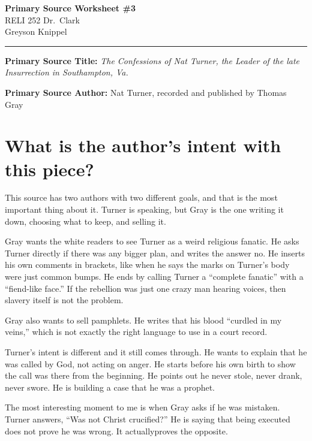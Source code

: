 \documentclass[12pt]{article}
\begin{document}
\begin{center}
	{\Large\bfseries Primary Source Worksheet \#3}\\[0.6em]
	RELI 252 \quad\textbullet\quad Dr.\ Clark\\[0.3em]
	Greyson Knippel
\end{center}

\vspace{1em}
\hrule
\vspace{1.5em}

\noindent\textbf{Primary Source Title:} \textit{The Confessions of Nat Turner, the Leader of the late Insurrection in Southampton, Va.}

\vspace{0.5em}

\noindent\textbf{Primary Source Author:} Nat Turner, recorded and published by Thomas Gray 

\section*{What is the author's intent with this piece?}

This source has two authors with two different goals, and that is the most important thing about it. Turner is speaking, but Gray is the one writing it down, choosing what to keep, and selling it.

Gray wants the white readers to see Turner as a weird religious fanatic. He asks Turner directly if there was any bigger plan, and writes the answer no. He inserts his own comments in brackets, like when he says the marks on Turner's body were just common bumps. He ends by calling Turner a ``complete fanatic'' with a ``fiend-like face.'' If the rebellion was just one crazy man hearing voices, then slavery itself is not the problem.

Gray also wants to sell pamphlets. He writes that his blood ``curdled in my veins,'' which is not exactly the right language to use in a court record.

Turner's intent is different and it still comes through. He wants to explain that he was called by God, not acting on anger. He starts before his own birth to show the call was there from the beginning. He points out he never stole, never drank, never swore. He is building a case that he was a prophet.

The most interesting moment to me is when Gray asks if he was mistaken. Turner answers, ``Was not Christ crucified?'' He is saying that being executed does not prove he was wrong. It actuallyproves the opposite.
\end{document}
